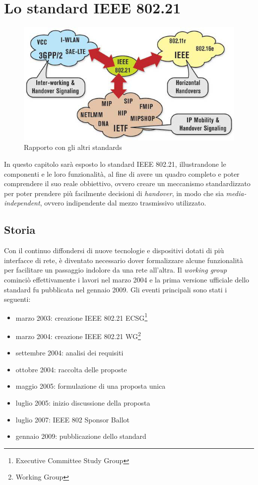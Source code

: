 \chapter{Lo standard IEEE 802.21}

\begin{figure}[h!]
\centering
\includegraphics[scale=0.6]{ieee80221_cloud.jpg}
\caption{Rapporto con gli altri standards}
\end{figure}

In questo capitolo sarà esposto lo standard IEEE 802.21\cite{standard}, illustrandone le componenti e le loro funzionalità, al fine di avere un quadro completo e poter comprendere il suo reale obbiettivo, ovvero creare un meccanismo standardizzato per poter prendere più facilmente decisioni di {\em handover}, in modo che sia {\em media-independent}, ovvero indipendente dal mezzo trasmissivo utilizzato.

\section{Storia}
Con il continuo diffondersi di nuove tecnologie e dispositivi dotati di più interfacce di rete, è diventato necessario dover formalizzare alcune funzionalità per facilitare un passaggio indolore da una rete all'altra.
Il {\em working group} cominciò effettivamente i lavori nel marzo 2004 e la prima versione ufficiale dello standard fu pubblicata nel gennaio 2009. Gli eventi principali sono stati i seguenti:
\begin{itemize}
\item marzo 2003: creazione IEEE 802.21 ECSG\footnote{Executive Committee Study Group}
\item marzo 2004: creazione IEEE 802.21 WG\footnote{Working Group}
\item settembre 2004: analisi dei requisiti
\item ottobre 2004: raccolta delle proposte
\item maggio 2005: formulazione di una proposta unica
\item luglio 2005: inizio discussione della proposta
\item luglio 2007: IEEE 802 Sponsor Ballot\cite{balloting}
\item gennaio 2009: pubblicazione dello standard
\end{itemize}

